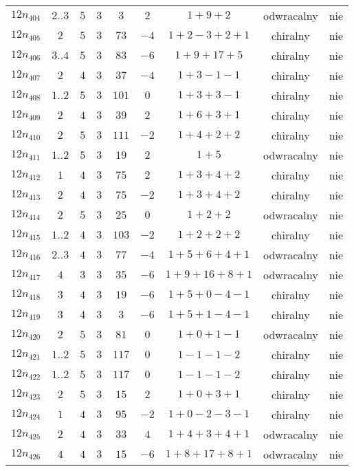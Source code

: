 \begin{longtable}{ccccccccc}
$12n_{404}$ & $2..3$ & $5$ & $3$ & $3$ & $2$ & $1+9+2$ & odwracalny & nie \\
$12n_{405}$ & $2$ & $5$ & $3$ & $73$ & $-4$ & $1+2-3+2+1$ & chiralny & nie \\
$12n_{406}$ & $3..4$ & $5$ & $3$ & $83$ & $-6$ & $1+9+17+5$ & chiralny & nie \\
$12n_{407}$ & $2$ & $4$ & $3$ & $37$ & $-4$ & $1+3-1-1$ & chiralny & nie \\
$12n_{408}$ & $1..2$ & $5$ & $3$ & $101$ & $0$ & $1+3+3-1$ & chiralny & nie \\
$12n_{409}$ & $2$ & $4$ & $3$ & $39$ & $2$ & $1+6+3+1$ & chiralny & nie \\
$12n_{410}$ & $2$ & $5$ & $3$ & $111$ & $-2$ & $1+4+2+2$ & chiralny & nie \\
$12n_{411}$ & $1..2$ & $5$ & $3$ & $19$ & $2$ & $1+5$ & odwracalny & nie \\
$12n_{412}$ & $1$ & $4$ & $3$ & $75$ & $2$ & $1+3+4+2$ & chiralny & nie \\
$12n_{413}$ & $2$ & $4$ & $3$ & $75$ & $-2$ & $1+3+4+2$ & chiralny & nie \\
$12n_{414}$ & $2$ & $5$ & $3$ & $25$ & $0$ & $1+2+2$ & odwracalny & nie \\
$12n_{415}$ & $1..2$ & $4$ & $3$ & $103$ & $-2$ & $1+2+2+2$ & chiralny & nie \\
$12n_{416}$ & $2..3$ & $4$ & $3$ & $77$ & $-4$ & $1+5+6+4+1$ & odwracalny & nie \\
$12n_{417}$ & $4$ & $3$ & $3$ & $35$ & $-6$ & $1+9+16+8+1$ & odwracalny & nie \\
$12n_{418}$ & $3$ & $4$ & $3$ & $19$ & $-6$ & $1+5+0-4-1$ & chiralny & nie \\
$12n_{419}$ & $3$ & $4$ & $3$ & $3$ & $-6$ & $1+5+1-4-1$ & chiralny & nie \\
$12n_{420}$ & $2$ & $5$ & $3$ & $81$ & $0$ & $1+0+1-1$ & odwracalny & nie \\
$12n_{421}$ & $1..2$ & $5$ & $3$ & $117$ & $0$ & $1-1-1-2$ & chiralny & nie \\
$12n_{422}$ & $1..2$ & $5$ & $3$ & $117$ & $0$ & $1-1-1-2$ & chiralny & nie \\
$12n_{423}$ & $2$ & $5$ & $3$ & $15$ & $2$ & $1+0+3+1$ & chiralny & nie \\
$12n_{424}$ & $1$ & $4$ & $3$ & $95$ & $-2$ & $1+0-2-3-1$ & chiralny & nie \\
$12n_{425}$ & $2$ & $4$ & $3$ & $33$ & $4$ & $1+4+3+4+1$ & odwracalny & nie \\
$12n_{426}$ & $4$ & $4$ & $3$ & $15$ & $-6$ & $1+8+17+8+1$ & odwracalny & nie \\

\end{longtable}
